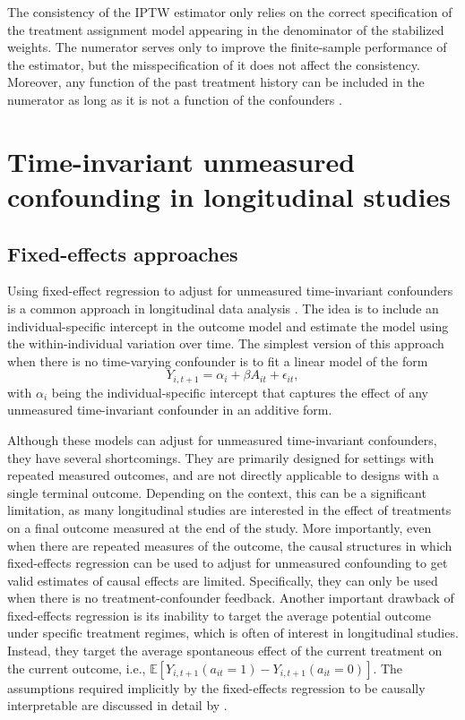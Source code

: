 The consistency of the IPTW estimator only relies on the correct 
specification of the treatment assignment model appearing in the denominator of the stabilized weights. 
The numerator serves only to improve the finite-sample performance of the estimator, but the misspecification 
of it does not affect the consistency. 
Moreover, any function of the past treatment history can be included in the numerator as long as it is not a function 
of the confounders \cite{robinsMarginalStructuralModels2000a}.

\section{Time-invariant unmeasured confounding in longitudinal studies}

\subsection{Fixed-effects approaches}
Using fixed-effect regression to adjust for unmeasured time-invariant confounders is a common approach in 
longitudinal data analysis \cite{imaiWhenShouldWe2019}. The idea is to include an individual-specific intercept 
in the outcome model and estimate the model using the within-individual variation over time. The simplest 
version of this approach when there is no time-varying confounder is to fit a linear model of the form
$$Y_{i,t+1} = \alpha_i + \beta A_{it} + \epsilon_{it},$$
with $\alpha_i$ being the individual-specific intercept that captures the effect of any 
unmeasured time-invariant confounder in an additive form. 

Although these models can adjust for unmeasured time-invariant confounders, they have 
several shortcomings. They are primarily designed for settings with repeated measured outcomes, 
and are not directly applicable to designs with a single terminal outcome. Depending on the 
context, this can be a significant limitation, as many longitudinal studies are 
interested in the effect of treatments on a final outcome measured at the end of the study. 
More importantly, even when there are repeated measures of the outcome, the causal structures in which 
fixed-effects regression can be used to adjust for unmeasured confounding to get valid estimates of causal effects are limited. Specifically, 
they can only be used when there is no treatment-confounder feedback. Another important drawback 
of fixed-effects regression is its inability to target the average 
potential outcome under specific treatment regimes, which is often of 
interest in longitudinal studies. Instead, 
they target the average spontaneous effect of the current treatment 
on the current outcome, i.e., $\mathbb{E}[Y_{i,t+1}(a_{it}=1) - Y_{i,t+1}(a_{it}=0)]$. 
The assumptions 
required implicitly by the fixed-effects regression to be causally interpretable are discussed in 
detail by . 


